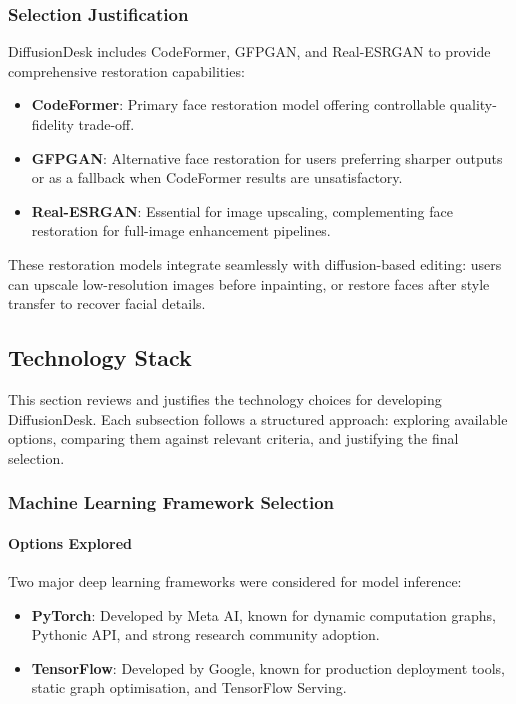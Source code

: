 \documentclass[12pt,a4paper]{report}
\begin{document}
\subsubsection{Selection Justification}

DiffusionDesk includes CodeFormer, GFPGAN, and Real-ESRGAN to provide comprehensive restoration capabilities:

\begin{itemize}
    \item \textbf{CodeFormer}: Primary face restoration model offering controllable quality-fidelity trade-off.
    \item \textbf{GFPGAN}: Alternative face restoration for users preferring sharper outputs or as a fallback when CodeFormer results are unsatisfactory.
    \item \textbf{Real-ESRGAN}: Essential for image upscaling, complementing face restoration for full-image enhancement pipelines.
\end{itemize}

These restoration models integrate seamlessly with diffusion-based editing: users can upscale low-resolution images before inpainting, or restore faces after style transfer to recover facial details.

\subsection{Technology Stack}

This section reviews and justifies the technology choices for developing DiffusionDesk. Each subsection follows a structured approach: exploring available options, comparing them against relevant criteria, and justifying the final selection.

\subsubsection{Machine Learning Framework Selection}

\paragraph{Options Explored}

Two major deep learning frameworks were considered for model inference:
\begin{itemize}
    \item \textbf{PyTorch}: Developed by Meta AI, known for dynamic computation graphs, Pythonic API, and strong research community adoption.
    \item \textbf{TensorFlow}: Developed by Google, known for production deployment tools, static graph optimisation, and TensorFlow Serving.
\end{itemize}
\end{document}
